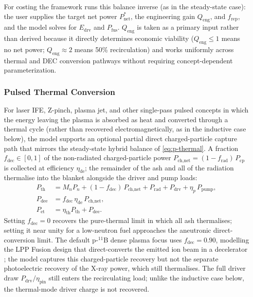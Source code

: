 \documentclass{article}
\begin{document}
For costing the framework runs this balance inverse (as in the steady-state
case): the user supplies the target net power $P_{\text{net}}^*$, the
engineering gain $Q_{\text{eng}}$, and $f_{\text{rep}}$, and the model solves
for $E_{\text{drv}}$ and $P_{\text{fus}}$. $Q_{\text{eng}}$ is taken as a
primary input rather than derived because it directly determines economic
viability ($Q_{\text{eng}} \le 1$ means no net power; $Q_{\text{eng}}
\approx 2$ means 50\% recirculation) and works uniformly across thermal and
DEC conversion pathways without requiring concept-dependent
parameterization.

\subsubsection{Pulsed Thermal Conversion}
For laser IFE, Z-pinch, plasma jet, and other single-pass pulsed concepts in
which the energy leaving the plasma is absorbed as heat and converted through
a thermal cycle (rather than recovered electromagnetically, as in the
inductive case below), the model supports an optional partial direct
charged-particle capture path that mirrors the steady-state hybrid balance
of \cref{eq:p-thermal}. A fraction
$f_{\text{dec}} \in [0, 1]$ of the non-radiated charged-particle
power $P_{\text{ch,net}} = (1 - f_{\text{rad}})\,P_{\text{cp}}$ is
collected at efficiency $\eta_{\text{de}}$; the remainder of the ash
and all of the radiation thermalise into the blanket alongside the
driver and pump loads:
\begin{align}
P_{\text{th}} &= M_n P_n + (1 - f_{\text{dec}})\,P_{\text{ch,net}}
  + P_{\text{rad}} + P_{\text{drv}} + \eta_p \, P_{\text{pump}}, \\
P_{\text{dee}} &= f_{\text{dec}}\,\eta_{\text{de}}\,P_{\text{ch,net}}, \\
P_{\text{et}} &= \eta_{\text{th}} P_{\text{th}} + P_{\text{dee}}.
\end{align}
Setting $f_{\text{dec}} = 0$ recovers the pure-thermal limit in which
all ash thermalises; setting it near unity for a low-neutron fuel
approaches the aneutronic direct-conversion limit. The default
p-${}^{11}$B dense plasma focus uses $f_{\text{dec}} = 0.90$, modelling
the LPP Fusion design that direct-converts the emitted ion beam in a
decelerator \citep{lerner2023dpf}; the model captures this
charged-particle recovery but not the separate photoelectric recovery of
the X-ray power, which still thermalises.
The full driver draw $P_{\text{drv}}/\eta_{\text{pin}}$ still enters
the recirculating load; unlike the inductive case below, the
thermal-mode driver charge is not recovered.
\end{document}

